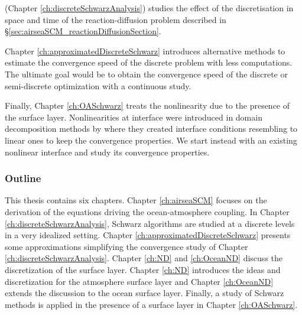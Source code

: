 \citep{clement_discrete_2022-1} (Chapter
\ref{ch:discreteSchwarzAnalysis}) studies the effect
of the discretisation in space and time of the reaction-diffusion
problem described in
\S\ref{sec:airseaSCM_reactionDiffusionSection}.
\par
Chapter \ref{ch:approximatedDiscreteSchwarz}
introduces alternative methods to estimate the convergence
speed of the discrete problem with less computations.
The ultimate goal would be to obtain the convergence speed of
the discrete or semi-discrete optimization with a continuous study.
\par
Finally, Chapter \ref{ch:OASchwarz} treats the nonlinearity due
to the presence of the surface layer. Nonlinearities
at interface were introduced in domain decomposition methods by
\citep{caetano_schwarz_2011} where they created interface
conditions resembling to linear ones to keep the convergence
properties. We start instead with an existing nonlinear interface
and study its convergence properties.
\subsubsection*{Outline}
This thesis contains six chapters.
Chapter \ref{ch:airseaSCM} focuses on the derivation of the equations
driving the ocean-atmosphere coupling.
In Chapter \ref{ch:discreteSchwarzAnalysis}, Schwarz algorithms are studied at a discrete
levels in a very idealized setting.
Chapter \ref{ch:approximatedDiscreteSchwarz} presents some approximations simplifying the
convergence study of Chapter \ref{ch:discreteSchwarzAnalysis}.
Chapter \ref{ch:ND} and \ref{ch:OceanND} discuss the discretization of the
surface layer. Chapter \ref{ch:ND} introduces the ideas and discretization
for the atmosphere surface layer and Chapter \ref{ch:OceanND} extends the
discussion to the ocean surface layer.
Finally, a study of Schwarz methods is applied
in the presence of a surface layer in Chapter \ref{ch:OASchwarz}.
